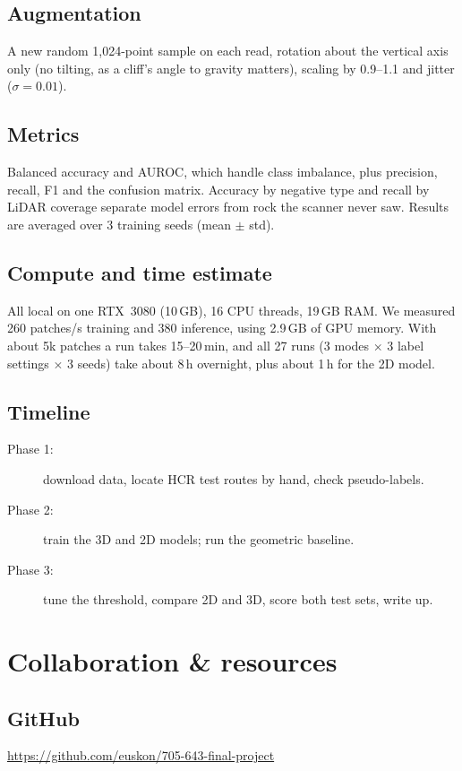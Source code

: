 \documentclass{mva2011}
\begin{document}
\subsection{Augmentation}
    A new random 1,024-point sample on each read, rotation about the vertical axis only (no tilting, as a cliff's angle to gravity matters), scaling by 0.9--1.1 and jitter ($\sigma=0.01$).

\subsection{Metrics}
    Balanced accuracy and AUROC, which handle class imbalance, plus precision, recall, F1 and the confusion matrix. Accuracy by negative type and recall by LiDAR coverage separate model errors from rock the scanner never saw. Results are averaged over 3 training seeds (mean $\pm$ std).

\subsection{Compute and time estimate}
    All local on one RTX~3080 (10\,GB), 16 CPU threads, 19\,GB RAM. We measured 260 patches/s training and 380 inference, using 2.9\,GB of GPU memory. With about 5k patches a run takes 15--20\,min, and all 27 runs (3 modes $\times$ 3 label settings $\times$ 3 seeds) take about 8\,h overnight, plus about 1\,h for the 2D model.

\subsection{Timeline}
    \begin{description}
    \item[Phase 1:] download data, locate HCR test routes by hand, check pseudo-labels.
    \item[Phase 2:] train the 3D and 2D models; run the geometric baseline.
    \item[Phase 3:] tune the threshold, compare 2D and 3D, score both test sets, write up.
    \end{description}

\section{Collaboration \& resources}
    \subsection{GitHub}
   \url{https://github.com/euskon/705-643-final-project}
\end{document}
